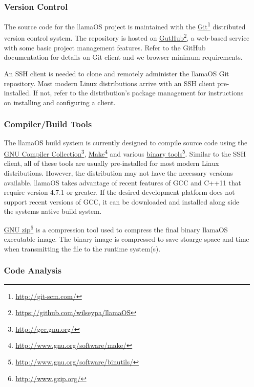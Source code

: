 \documentclass[draft]{article}
\begin{document}
\subsubsection{Version Control}

The source code for the llamaOS project is maintained with the 
\href{http://git-scm.com/}{Git}\footnote{\url{http://git-scm.com/}} 
distributed version control system.  The repository is hosted on 
\href{https://github.com/wilseypa/llamaOS}{GutHub}\footnote{\url{
https://github.com/wilseypa/llamaOS}}, a web-based service with some basic 
project management features.  Refer to the GitHub documentation for details on 
Git client and we browser minimum requirements.

An SSH client is needed to clone and remotely administer the llamaOS Git 
repository.  Most modern Linux distributions arrive with an SSH client 
pre-installed.  If not, refer to the distribution's package management for 
instructions on installing and configuring a client.

\subsubsection{Compiler/Build Tools}

The llamaOS build system is currently designed to compile source code using 
the \href{http://gcc.gnu.org/}{GNU Compiler 
Collection}\footnote{\url{http://gcc.gnu.org/}}, 
\href{http://www.gnu.org/software/make/}{Make}\footnote{\url{
http://www.gnu.org/software/make/}} and various
\href{http://www.gnu.org/software/binutils/}{binary 
tools}\footnote{\url{http://www.gnu.org/software/binutils/}}.  Similar to the 
SSH client, all of these tools are usually pre-installed for most modern Linux 
distributions.  However, the distribution may not have the necessary versions 
available.  llamaOS takes advantage of recent features of GCC and C++11 that 
require version 4.7.1 or greater.  If the desired development platform does not 
support recent versions of GCC, it can be downloaded and installed along side 
the systems native build system.

\href{http://www.gzip.org/}{GNU zip}\footnote{\url{http://www.gzip.org/}} is a 
compression tool used to compress the final binary llamaOS executable image. 
The binary image is compressed to save stoarge space and time when transmitting 
the file to the runtime system(s).

\subsubsection{Code Analysis}
\end{document}
